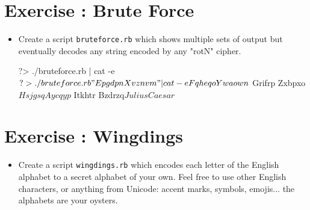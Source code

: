 \documentclass{42-en}
\begin{document}

\chapter{Exercise \exercicenumber: Brute Force}

\exnumber{\exercicenumber}


\begin{itemize}

\item Create a script \texttt{bruteforce.rb} which shows multiple sets of output but eventually decodes any string encoded by any "rotN" cipher.

\begin{42console}
	?> ./bruteforce.rb | cat -e
	$
	?> ./bruteforce.rb "Epgdpn Xvznvm" | cat -e
	Fqheqo Ywaown$
	Grifrp Zxbpxo$
	Hsjgsq Aycqyp$
	Itkhtr Bzdrzq$
	Julius Caesar$
\end{42console}

\end{itemize}


\chapter{Exercise \exercicenumber: Wingdings}

\exnumber{\exercicenumber}


\begin{itemize}

\item Create a script \texttt{wingdings.rb} which encodes each letter of the English alphabet to a secret alphabet of your own. Feel free to use other English characters, or anything from Unicode: accent marks, symbols, emojis... the alphabets are your oysters.

\end{itemize}
\end{document}
